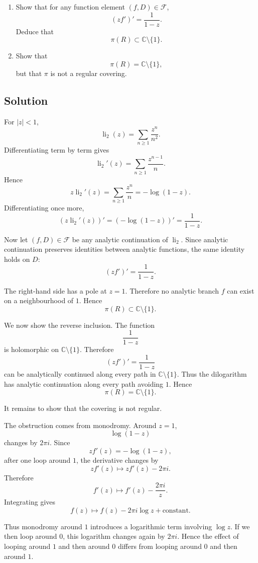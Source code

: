 \documentclass[12pt,a4paper]{article}
\theoremstyle{notespace}
\begin{document}
\begin{enumerate}
	\item[(i)] Show that for any function element \((f,D)\in \mathcal F\),
	\[
	(zf')'=\frac{1}{1-z}.
	\]
	Deduce that
	\[
	\pi(R)\subset \mathbb C\setminus\{1\}.
	\]
	
	\item[(ii)] Show that
	\[
	\pi(R)=\mathbb C\setminus\{1\},
	\]
	but that \(\pi\) is not a regular covering.
\end{enumerate}

\subsection*{Solution}

For \(|z|<1\),
\[
\operatorname{li}_2(z)=\sum_{n\geq 1}\frac{z^n}{n^2}.
\]
Differentiating term by term gives
\[
\operatorname{li}_2'(z)=\sum_{n\geq 1}\frac{z^{n-1}}{n}.
\]
Hence
\[
z\operatorname{li}_2'(z)
=
\sum_{n\geq 1}\frac{z^n}{n}
=
-\log(1-z).
\]
Differentiating once more,
\[
(z\operatorname{li}_2'(z))'
=
(-\log(1-z))'
=
\frac{1}{1-z}.
\]

Now let \((f,D)\in \mathcal F\) be any analytic continuation of \(\operatorname{li}_2\). Since analytic continuation preserves identities between analytic functions, the same identity holds on \(D\):
\[
(zf')'=\frac{1}{1-z}.
\]

The right-hand side has a pole at \(z=1\). Therefore no analytic branch \(f\) can exist on a neighbourhood of \(1\). Hence
\[
\pi(R)\subset \mathbb C\setminus\{1\}.
\]

We now show the reverse inclusion. The function
\[
\frac{1}{1-z}
\]
is holomorphic on \(\mathbb C\setminus\{1\}\). Therefore
\[
(zf')'
=
\frac{1}{1-z}
\]
can be analytically continued along every path in \(\mathbb C\setminus\{1\}\). Thus the dilogarithm has analytic continuation along every path avoiding \(1\). Hence
\[
\pi(R)=\mathbb C\setminus\{1\}.
\]

It remains to show that the covering is not regular.

The obstruction comes from monodromy. Around \(z=1\),
\[
\log(1-z)
\]
changes by \(2\pi i\). Since
\[
zf'(z)=-\log(1-z),
\]
after one loop around \(1\), the derivative changes by
\[
zf'(z)\mapsto zf'(z)-2\pi i.
\]
Therefore
\[
f'(z)\mapsto f'(z)-\frac{2\pi i}{z}.
\]
Integrating gives
\[
f(z)\mapsto f(z)-2\pi i\log z+\text{constant}.
\]

Thus monodromy around \(1\) introduces a logarithmic term involving \(\log z\). If we then loop around \(0\), this logarithm changes again by \(2\pi i\). Hence the effect of looping around \(1\) and then around \(0\) differs from looping around \(0\) and then around \(1\).
\end{document}
